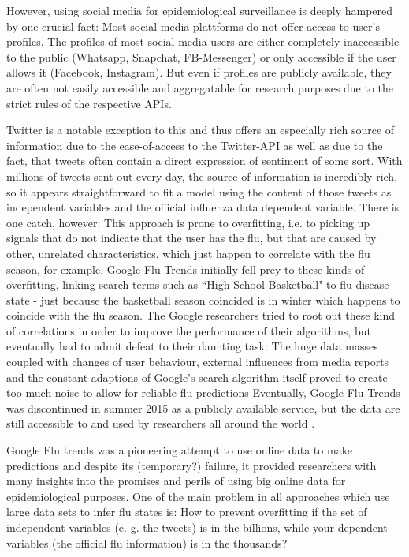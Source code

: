 \documentclass[11pt, a4paper]{report}\usepackage[]{graphicx}\usepackage[]{color}
\begin{document}
However, using social media for epidemiological surveillance is deeply hampered by one crucial fact: Most social media plattforms do not offer access to user's profiles. The profiles of most social media users are either completely inaccessible to the public (Whatsapp, Snapchat, FB-Messenger) or only accessible if the user allows it (Facebook, Instagram). But even if profiles are publicly available, they are often not easily accessible and aggregatable for research purposes due to the strict rules of the respective APIs.\newline

Twitter is a notable exception to this and thus offers an especially rich source of information due to the ease-of-access to the Twitter-API as well as due to the fact, that tweets often contain a direct expression of sentiment of some sort. With millions of tweets  sent out every day, the source of information is incredibly rich, so it appears straightforward to fit a model using the content of those tweets as independent variables and the official influenza data dependent variable. 
There is one catch, however: This approach is prone to overfitting, i.e. to picking up signals that do not indicate that the user has the flu, but that are caused by other, unrelated characteristics, which just happen to correlate with the flu season, for example. Google Flu Trends \citep{ginsberg_detecting_2009} initially fell prey to these kinds of overfitting, linking search terms such as ``High School Basketball" to flu disease state - just because the basketball season coincided is in winter which happens to coincide with the flu season. The Google researchers tried to root out these kind of correlations in order to improve the performance of their algorithms, but eventually had to admit defeat to their daunting task: The huge data masses coupled with changes of user behaviour, external influences from media reports and the constant adaptions of Google's search algorithm itself proved to create too much noise to allow for reliable flu predictions \citep{olson_reassessing_2013,butler_when_2013,lazer_parable_2014,} Eventually, Google Flu Trends was discontinued in summer 2015 as a publicly available service, but the data are still accessible to and used by researchers all around the world \citep{GFT_nextchapter_2015}.\newline

Google Flu trends was a pioneering attempt to use online data to make predictions and despite its (temporary?) failure, it provided researchers with many insights into the promises and perils of using big online data for epidemiological purposes. One of the main problem in all approaches which use large data sets to infer flu states is: How to prevent overfitting if the set of independent variables (e. g. the tweets) is in the billions, while your dependent variables (the official flu information) is in the thousands?\newline
\end{document}
